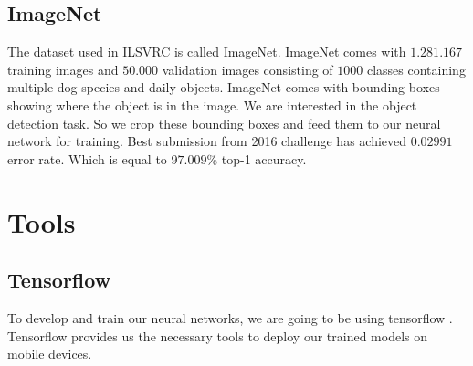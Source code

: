 \subsection{ImageNet}
The dataset used in ILSVRC is called ImageNet. ImageNet \cite{deng2012image} comes with $1.281.167$ training images and $50.000$ validation images consisting of $1000$ classes containing multiple dog species and daily objects. ImageNet comes with bounding boxes showing where the object is in the image. We are interested in the object detection task. So we crop these bounding boxes and feed them to our neural network for training. Best submission from 2016 challenge has achieved $0.02991$ error rate. Which is equal to $97.009\%$ top-1 accuracy. 

\section{Tools}
\subsection{Tensorflow}
To develop and train our neural networks, we are going to be using tensorflow \cite{abadi2016tensorflow}. Tensorflow provides us the necessary tools to deploy our trained models on mobile devices. 